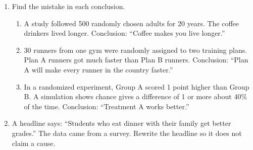 \documentclass[11pt]{article}
\begin{document}
\begin{enumerate}
\begin{enumerate}[itemsep=1em]
\end{enumerate}

\newpage
\item Find the mistake in each conclusion.
\begin{enumerate}[itemsep=3.5em]
  \item A study followed 500 randomly chosen adults for 20 years. The coffee drinkers lived longer. Conclusion: ``Coffee makes you live longer.''

  \item 30 runners from one gym were randomly assigned to two training plans. Plan A runners got much faster than Plan B runners. Conclusion: ``Plan A will make every runner in the country faster.''

  \item In a randomized experiment, Group A scored 1 point higher than Group B. A simulation shows chance gives a difference of 1 or more about 40\% of the time. Conclusion: ``Treatment A works better.''

\end{enumerate}
\work{2em}

\item A headline says: ``Students who eat dinner with their family get better grades.'' The data came from a survey.
Rewrite the headline so it does not claim a cause.


\end{enumerate}
\end{document}
